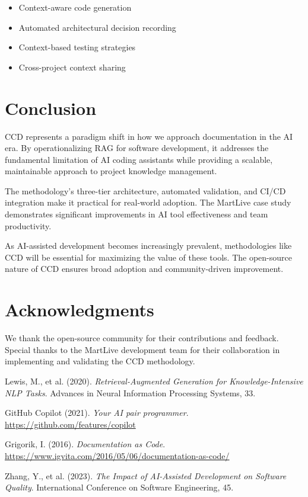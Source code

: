 \documentclass[11pt,a4paper]{article}
\begin{document}
\begin{itemize}
    \item Context-aware code generation
    \item Automated architectural decision recording
    \item Context-based testing strategies
    \item Cross-project context sharing
\end{itemize}

\section{Conclusion}

CCD represents a paradigm shift in how we approach documentation in the AI era. By operationalizing RAG for software development, it addresses the fundamental limitation of AI coding assistants while providing a scalable, maintainable approach to project knowledge management.

The methodology's three-tier architecture, automated validation, and CI/CD integration make it practical for real-world adoption. The MartLive case study demonstrates significant improvements in AI tool effectiveness and team productivity.

As AI-assisted development becomes increasingly prevalent, methodologies like CCD will be essential for maximizing the value of these tools. The open-source nature of CCD ensures broad adoption and community-driven improvement.

\section{Acknowledgments}

We thank the open-source community for their contributions and feedback. Special thanks to the MartLive development team for their collaboration in implementing and validating the CCD methodology.


\begin{thebibliography}{9}

Lewis, M., et al. (2020).
\textit{Retrieval-Augmented Generation for Knowledge-Intensive NLP Tasks}.
Advances in Neural Information Processing Systems, 33.

GitHub Copilot (2021).
\textit{Your AI pair programmer}.
\url{https://github.com/features/copilot}

Grigorik, I. (2016).
\textit{Documentation as Code}.
\url{https://www.igvita.com/2016/05/06/documentation-as-code/}

Zhang, Y., et al. (2023).
\textit{The Impact of AI-Assisted Development on Software Quality}.
International Conference on Software Engineering, 45.

\end{thebibliography}
\end{document}
